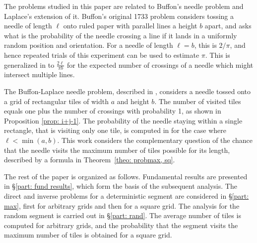 \documentclass[12pt, a4paper]{article}
\newcommand{\len}{\ell} %
\begin{document}

The problems studied in this paper are related to Buffon's needle problem and Laplace's extension of it. Buffon's original 1733 problem considers tossing a needle of length $\len$ onto ruled paper with parallel lines a height $b$ apart, and asks what is the probability of the needle crossing a line if it lands in a uniformly random position and orientation. For a needle of length $\len = b$, this is $2/\pi$, and hence repeated trials of this experiment can be used to estimate $\pi$. This is generalized in \cite{Ramaley69} to $\frac{2\len}{\pi b}$ for the expected number of crossings of a needle which might intersect multiple lines.

The Buffon-Laplace needle problem, described in \cite{Mathai99}, considers a needle tossed onto a grid of rectangular tiles of width $a$ and height $b$. The number of visited tiles equals one plus the number of crossings with probability 1, as shown in Proposition \ref{prop: 
i+j-1}. The probability of the needle staying within a single rectangle, that is visiting only one tile, is computed in \cite{Arnow94} for the case where $\len < \min(a,b)$. This work considers the complementary question of the chance that the needle visits the maximum number of tiles possible for its length, described by a formula in Theorem~\ref{theo: probmax, sq}.


The rest of the paper is organized as follows. Fundamental results are presented in \S\ref{part: fund results}, which form the basis of the subsequent analysis. The direct and inverse problems for a deterministic segment are considered in \S\ref{part: max}, first for arbitrary grids and then for a square grid. The analysis for the random segment is carried out in \S\ref{part: rand}. The average number of tiles is computed for arbitrary grids, and the probability that the segment visits the maximum number of tiles is obtained for a square grid.

\end{document}
